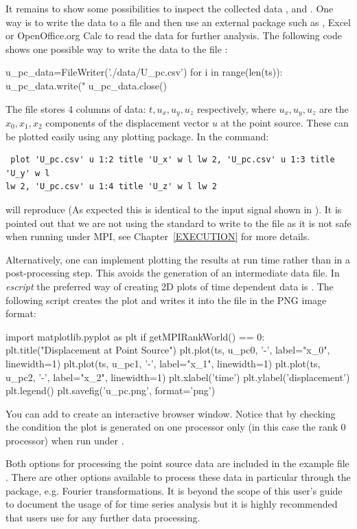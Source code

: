 It remains to show some possibilities to inspect the collected data
,  and .
One way is to write the data to a file and then use an external package such
as \gnuplot, Excel or OpenOffice.org Calc to read the data for further analysis.
The following code shows one possible way to write the data to the file :
\begin{python}
  u_pc_data=FileWriter('./data/U_pc.csv')
  for i in range(len(ts)):
      u_pc_data.write("%
  u_pc_data.close()
\end{python}
The file  stores 4 columns of data: $t,u_x,u_y,u_z$
respectively, where $u_x,u_y,u_z$ are the
$x_0,x_1,x_2$ components of the displacement
vector $u$ at the point source.
These can be plotted easily using any plotting package.
In \gnuplot the command:
\begin{verbatim}
 plot 'U_pc.csv' u 1:2 title 'U_x' w l lw 2, 'U_pc.csv' u 1:3 title 'U_y' w l
lw 2, 'U_pc.csv' u 1:4 title 'U_z' w l lw 2
\end{verbatim}
will reproduce  (As expected this is identical to the input
signal shown in ).
It is pointed out that we are not using the standard \PYTHON {}
to write to the file  as it is not safe when running \escript
under MPI, see Chapter~\ref{EXECUTION} for more details.

Alternatively, one can implement plotting the results at run time rather than
in a post-processing step.
This avoids the generation of an intermediate data file.
In {\it escript} the preferred way of creating 2D plots of time dependent data
is \MATPLOTLIB. The following script creates the plot and writes it into the
file  in the PNG image format:
\begin{python}
  import matplotlib.pyplot as plt
  if getMPIRankWorld() == 0:
      plt.title("Displacement at Point Source")
      plt.plot(ts, u_pc0, '-', label="x_0", linewidth=1)
      plt.plot(ts, u_pc1, '-', label="x_1", linewidth=1)
      plt.plot(ts, u_pc2, '-', label="x_2", linewidth=1)
      plt.xlabel('time')
      plt.ylabel('displacement')
      plt.legend()
      plt.savefig('u_pc.png', format='png')
\end{python}
You can add  to create an interactive browser window.
Notice that by checking the condition  the plot
is generated on one processor only (in this case the rank 0 processor) when
run under \MPI. 

Both options for processing the point source data are included in the example
file . There are other options available to process these data
in particular through the \SCIPY package, e.g. Fourier transformations.
It is beyond the scope of this user's guide to document the usage of
\SCIPY for time series analysis but it is highly recommended that users use
\SCIPY for any further data processing.

